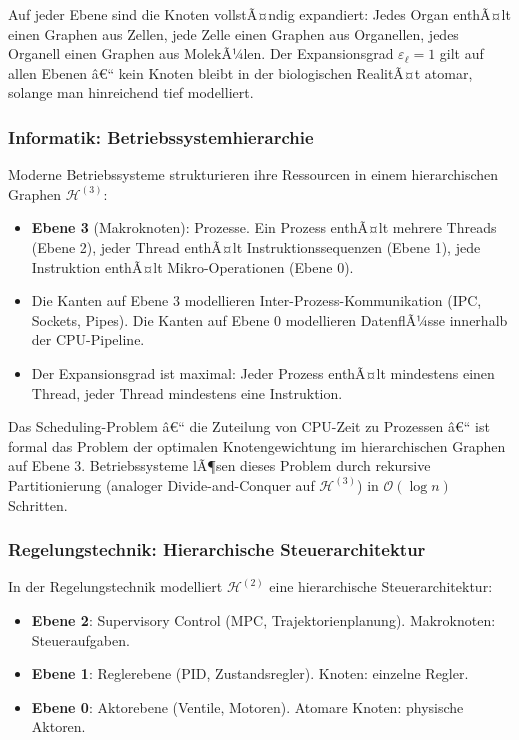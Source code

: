 ﻿\documentclass[12pt,a4paper,twoside]{article}
\theoremstyle{definition}
\theoremstyle{plain}
\theoremstyle{remark}
\begin{document}
Auf jeder Ebene sind die Knoten vollstÃ¤ndig expandiert: Jedes Organ enthÃ¤lt einen Graphen aus Zellen, jede Zelle einen Graphen aus Organellen, jedes Organell einen Graphen aus MolekÃ¼len. Der Expansionsgrad $\varepsilon_\ell = 1$ gilt auf allen Ebenen â€“ kein Knoten bleibt in der biologischen RealitÃ¤t atomar, solange man hinreichend tief modelliert.

\subsubsection{Informatik: Betriebssystemhierarchie}

Moderne Betriebssysteme strukturieren ihre Ressourcen in einem
hierarchischen Graphen $\mathcal{H}^{(3)}$:

\begin{itemize}
	\item \textbf{Ebene 3} (Makroknoten): Prozesse.  Ein Prozess
	enthÃ¤lt mehrere Threads (Ebene 2), jeder Thread enthÃ¤lt
	Instruktionssequenzen (Ebene 1), jede Instruktion enthÃ¤lt
	Mikro-Operationen (Ebene 0).
	\item Die Kanten auf Ebene 3 modellieren Inter-Prozess-Kommunikation
	(IPC, Sockets, Pipes).  Die Kanten auf Ebene 0 modellieren
	DatenflÃ¼sse innerhalb der CPU-Pipeline.
	\item Der Expansionsgrad ist maximal: Jeder Prozess enthÃ¤lt
	mindestens einen Thread, jeder Thread mindestens eine
	Instruktion.
\end{itemize}

Das Scheduling-Problem â€“ die Zuteilung von CPU-Zeit zu Prozessen â€“
ist formal das Problem der optimalen Knotengewichtung im
hierarchischen Graphen auf Ebene 3.  Betriebssysteme lÃ¶sen dieses
Problem durch rekursive Partitionierung (analoger Divide-and-Conquer
auf $\mathcal{H}^{(3)}$) in $\mathcal{O}(\log n)$ Schritten.

\subsubsection{Regelungstechnik: Hierarchische Steuerarchitektur}

In der Regelungstechnik modelliert $\mathcal{H}^{(2)}$ eine
hierarchische Steuerarchitektur:

\begin{itemize}
	\item \textbf{Ebene 2}: Supervisory Control (MPC, Trajektorien\-planung).
	Makroknoten: Steueraufgaben.
	\item \textbf{Ebene 1}: Reglerebene (PID, Zustandsregler).
	Knoten: einzelne Regler.
	\item \textbf{Ebene 0}: Aktorebene (Ventile, Motoren).
	Atomare Knoten: physische Aktoren.
\end{itemize}
\end{document}

